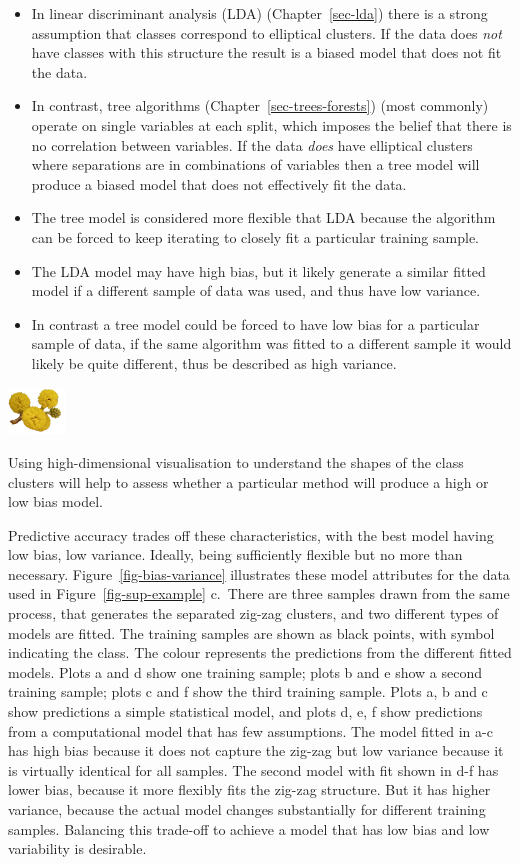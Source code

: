 \documentclass[
  letterpaper,
]{krantz}
\providecommand{\tightlist}{%
  \setlength{\itemsep}{0pt}\setlength{\parskip}{0pt}}\usepackage{longtable,booktabs,array}
\newcommand{\infobox}[1]{%
\noindent\colorbox{info!30}{%
\begin{minipage}{0.98\linewidth}%
    \centering%
    \begin{minipage}[c]{0.15\linewidth} %
      \includegraphics[width=1.5cm]{images/mulga-flowers2.png} %
    \end{minipage}%
    \hfill %
    \begin{minipage}[c]{0.8\linewidth} %
      \bigskip%
      \textsf{#1}%
      \bigskip%
    \end{minipage}%
    \hspace*{3mm}%
  \end{minipage}%
}%
}
\begin{document}
\begin{itemize}
\tightlist
\item
  In linear discriminant analysis (LDA) (Chapter~\ref{sec-lda}) there is
  a strong assumption that classes correspond to elliptical clusters. If
  the data does \emph{not} have classes with this structure the result
  is a biased model that does not fit the data.
\item
  In contrast, tree algorithms (Chapter~\ref{sec-trees-forests}) (most
  commonly) operate on single variables at each split, which imposes the
  belief that there is no correlation between variables. If the data
  \emph{does} have elliptical clusters where separations are in
  combinations of variables then a tree model will produce a biased
  model that does not effectively fit the data.
\item
  The tree model is considered more flexible that LDA because the
  algorithm can be forced to keep iterating to closely fit a particular
  training sample.
\item
  The LDA model may have high bias, but it likely generate a similar
  fitted model if a different sample of data was used, and thus have low
  variance.
\item
  In contrast a tree model could be forced to have low bias for a
  particular sample of data, if the same algorithm was fitted to a
  different sample it would likely be quite different, thus be described
  as high variance.
\end{itemize}

 

\infobox{Using high-dimensional visualisation to understand the shapes of the class clusters will help to assess whether a particular method will produce a high or low bias model.}

Predictive accuracy trades off these characteristics, with the best
model having low bias, low variance. Ideally, being sufficiently
flexible but no more than necessary. Figure~\ref{fig-bias-variance}
illustrates these model attributes for the data used in
Figure~\ref{fig-sup-example} c.~There are three samples drawn from the
same process, that generates the separated zig-zag clusters, and two
different types of models are fitted. The training samples are shown as
black points, with symbol indicating the class. The colour represents
the predictions from the different fitted models. Plots a and d show one
training sample; plots b and e show a second training sample; plots c
and f show the third training sample. Plots a, b and c show predictions
a simple statistical model, and plots d, e, f show predictions from a
computational model that has few assumptions. The model fitted in a-c
has high bias because it does not capture the zig-zag but low variance
because it is virtually identical for all samples. The second model with
fit shown in d-f has lower bias, because it more flexibly fits the
zig-zag structure. But it has higher variance, because the actual model
changes substantially for different training samples. Balancing this
trade-off to achieve a model that has low bias and low variability is
desirable.
\end{document}
